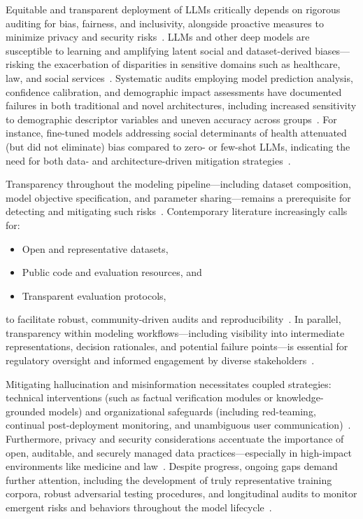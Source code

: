 Equitable and transparent deployment of LLMs critically depends on rigorous auditing for bias, fairness, and inclusivity, alongside proactive measures to minimize privacy and security risks~\cite{ref1, ref2, ref3, ref10, ref14, ref21, ref22, ref23, ref36, ref42, ref43, ref44, ref46, ref49, ref52, ref53, ref65, ref73}. LLMs and other deep models are susceptible to learning and amplifying latent social and dataset-derived biases—risking the exacerbation of disparities in sensitive domains such as healthcare, law, and social services~\cite{ref3, ref10, ref21, ref22, ref23, ref42, ref43, ref44, ref49, ref52, ref53, ref65}. Systematic audits employing model prediction analysis, confidence calibration, and demographic impact assessments have documented failures in both traditional and novel architectures, including increased sensitivity to demographic descriptor variables and uneven accuracy across groups~\cite{ref22, ref44, ref49, ref53}. For instance, fine-tuned models addressing social determinants of health attenuated (but did not eliminate) bias compared to zero- or few-shot LLMs, indicating the need for both data- and architecture-driven mitigation strategies~\cite{ref22, ref23}.

Transparency throughout the modeling pipeline—including dataset composition, model objective specification, and parameter sharing—remains a prerequisite for detecting and mitigating such risks~\cite{ref14, ref36, ref46, ref65, ref73}. Contemporary literature increasingly calls for: 
\begin{itemize}
    \item Open and representative datasets,
    \item Public code and evaluation resources, and
    \item Transparent evaluation protocols,
\end{itemize}
to facilitate robust, community-driven audits and reproducibility~\cite{ref1, ref36, ref44, ref49, ref65, ref73}. In parallel, transparency within modeling workflows—including visibility into intermediate representations, decision rationales, and potential failure points—is essential for regulatory oversight and informed engagement by diverse stakeholders~\cite{ref14, ref45, ref46, ref49, ref52, ref65}.

Mitigating hallucination and misinformation necessitates coupled strategies: technical interventions (such as factual verification modules or knowledge-grounded models) and organizational safeguards (including red-teaming, continual post-deployment monitoring, and unambiguous user communication)~\cite{ref3, ref10, ref21, ref42, ref43, ref65}. Furthermore, privacy and security considerations accentuate the importance of open, auditable, and securely managed data practices—especially in high-impact environments like medicine and law~\cite{ref14, ref36, ref42, ref46, ref53, ref65}. Despite progress, ongoing gaps demand further attention, including the development of truly representative training corpora, robust adversarial testing procedures, and longitudinal audits to monitor emergent risks and behaviors throughout the model lifecycle~\cite{ref21, ref23, ref42, ref65, ref73}.

